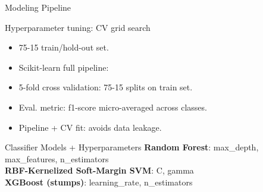 \documentclass{beamer}
\begin{document}
\begin{frame}{Modeling Pipeline}
\begin{block}{Hyperparameter tuning: CV grid search}	
	\begin{itemize}
		\item 75-15 train/hold-out set. 
		\item Scikit-learn full pipeline:
		
			\begin{adjustbox}{max totalsize={.9\textwidth}{.7\textheight},{margin= 3mm}, center}
			
			
		\end{adjustbox}
	\item 5-fold cross validation: 75-15 splits on train set. 
	\item Eval. metric: f1-score micro-averaged across classes.
	\item Pipeline + CV fit: avoids data leakage.
		
	\end{itemize}
	
\end{block}

\begin{block}{Classifier Models + Hyperparameters}
\textbf{Random Forest}: max\_depth, max\_features, n\_estimators \\ 
\textbf{RBF-Kernelized Soft-Margin SVM}: C, gamma \\ 
\textbf{XGBoost (stumps)}:  learning\_rate, n\_estimators
\end{block}

\end{frame}
\end{document}
